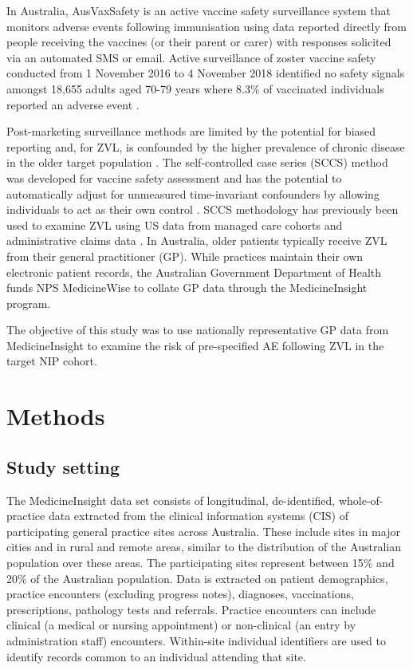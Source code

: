 \documentclass[review, endfloat]{elsarticle}
\begin{document}
In Australia, AusVaxSafety is an active vaccine safety surveillance system that monitors adverse events following immunisation using data reported directly from people receiving the vaccines (or their parent or carer) with responses solicited via an automated SMS or email. Active surveillance of zoster vaccine safety conducted from 1 November 2016 to 4 November 2018 identified no safety signals amongst 18,655 adults aged 70-79 years where 8.3\% of vaccinated individuals reported an adverse event \citep{ausvaxsafety}.

Post-marketing surveillance methods are limited by the potential for biased reporting and, for ZVL, is confounded by the higher prevalence of chronic disease in the older target population \citep{miller2018post}. The self-controlled case series (SCCS) method was developed for vaccine safety assessment and has the potential to automatically adjust for unmeasured time-invariant confounders by allowing individuals to act as their own control \citep{petersen2016}. SCCS methodology has previously been used to examine ZVL using US data from managed care cohorts \citep{tseng2012} and administrative claims data \citep{minassian2015}. In Australia, older patients typically receive ZVL from their general practitioner (GP). While practices maintain their own electronic patient records, the Australian Government Department of Health funds NPS MedicineWise to collate GP data through the MedicineInsight program. 

The objective of this study was to use nationally representative GP data from MedicineInsight to examine the risk of pre-specified AE following ZVL in the target NIP cohort.

\section{Methods}

\subsection{Study setting}

The MedicineInsight data set consists of longitudinal, de-identified, whole-of-practice data extracted from the clinical information systems (CIS) of participating general practice sites across Australia. These include sites in major cities and in rural and remote areas, similar to the distribution of the Australian population over these areas. The participating sites represent between 15\% and 20\% of the Australian population.  Data is extracted on patient demographics, practice encounters (excluding progress notes), diagnoses, vaccinations, prescriptions, pathology tests and referrals. Practice encounters can include clinical (a medical or nursing appointment) or non-clinical (an entry by administration staff) encounters. Within-site individual identifiers are used to identify records common to an individual attending that site. 
\end{document}
